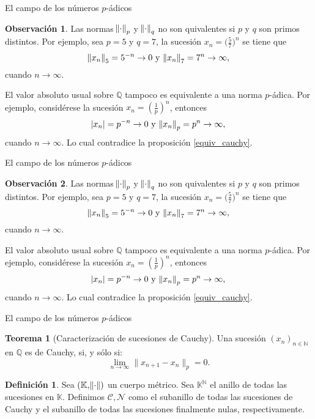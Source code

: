 \documentclass{beamer}
\newcommand{\bb}[1]{\mathbb{#1}}
\theoremstyle{definition}
\numberwithin{equation}{section}
\newcommand{\marine}[1]{\textcolor{defColor}{#1}}
\newcommand{\orangee}[1]{\textcolor{thColor}{#1}}
\newcommand{\redd}[1]{\textcolor{rkColor}{#1}}
\newtheorem{df}{\marine{Definición}}
\newtheorem{thh}{\orangee{Teorema}}
\newtheorem{rr}{\redd{Observación}}
\newcommand{\N}{\mathbb{N}}
\newcommand{\Q}{\mathbb{Q}}
\newcommand{\pnorm}[1]{\|#1\|_p}
\begin{document}
\begin{frame}{El campo de los números $p$-ádicos}
	\begin{rr}
			Las normas $\norm{\cdot}_p$ y $\norm{\cdot}_q$ no son quivalentes si $p$ y $q$ son primos distintos. Por ejemplo, sea $p=5$ y $q=7$, la sucesión 
		$x_n=\big (\frac{5}{7}\big)^n$ se tiene que 
		$$\norm{x_n}_5=5^{-n}\rightarrow 0 \text{ y } \norm{x_n}_7=7^{n}\rightarrow \infty ,$$
		cuando $n \rightarrow \infty$.
		
		El valor absoluto usual sobre $\Q$ tampoco es equivalente a una norma $p$-ádica. Por ejemplo, considérese la sucesión $x_n= (\frac{1}{p})^n$, entonces
		$$\abs{x_n}=p^{-n}\to 0 \text{ y } \norm{x_n}_p = p^n \to \infty,$$
		cuando $n\to\infty$. Lo cual contradice la proposición \ref{equiv_cauchy}.
	\end{rr}
\end{frame}
\begin{frame}{El campo de los números $p$-ádicos}
	\begin{rr}
		Las normas $\norm{\cdot}_p$ y $\norm{\cdot}_q$ no son quivalentes si $p$ y $q$ son primos distintos. Por ejemplo, sea $p=5$ y $q=7$, la sucesión 
		$x_n=\big (\frac{5}{7}\big)^n$ se tiene que 
		$$\norm{x_n}_5=5^{-n}\rightarrow 0 \text{ y } \norm{x_n}_7=7^{n}\rightarrow \infty ,$$
		cuando $n \rightarrow \infty$.
		
		El valor absoluto usual sobre $\Q$ tampoco es equivalente a una norma $p$-ádica. Por ejemplo, considérese la sucesión $x_n= (\frac{1}{p})^n$, entonces
		$$\abs{x_n}=p^{-n}\to 0 \text{ y } \norm{x_n}_p = p^n \to \infty,$$
		cuando $n\to\infty$. Lo cual contradice la proposición \ref{equiv_cauchy}.
	\end{rr}
\end{frame}
\begin{frame}{El campo de los números $p$-ádicos}
\begin{thh}
	[Caracterización de sucesiones de Cauchy]\label{car}
	Una sucesión $ (x_n)_{n\in\N}$ en $\Q$ es de Cauchy, si, y sólo si:
	\begin{equation}\label{car_cau}
	\lim_{n\to\infty}\pnorm{x_{n+1}-x_n}=0.
	\end{equation}
\end{thh}
\begin{df}
	Sea $ (\bb{K}, \norm{\cdot})$ un cuerpo métrico. Sea ${\bb{K}^\N}$ el anillo de todas las sucesiones en $\bb{K}$. Definimos $\mathcal C,\mathcal N $ como el subanillo de todas las sucesiones de Cauchy y el subanillo de todas las sucesiones finalmente nulas, respectivamente.
\end{df}
\end{frame}
\end{document}
